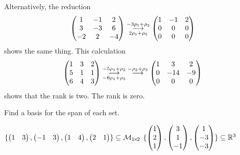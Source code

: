 \begin{exercises}
\begin{answer}
\begin{exparts}
           Alternatively, the reduction
           \begin{equation*}
             \begin{pmatrix}
               1  &-1  &2  \\
               3  &-3  &6  \\   
               -2 &2   &-4
             \end{pmatrix}
             \grstep[2\rho_1+\rho_3]{-3\rho_1+\rho_2}
             \begin{pmatrix}
               1  &-1  &2  \\
               0  &0   &0  \\   
               0  &0   &0 
             \end{pmatrix}
           \end{equation*}
           shows the same thing.
         \partsitem This calculation
           \begin{equation*}
             \begin{pmatrix}
               1  &3  &2  \\
               5  &1  &1  \\
               6  &4  &3  
             \end{pmatrix}
             \grstep[-6\rho_1+\rho_3]{-5\rho_1+\rho_2}
             \;\grstep{-\rho_2+\rho_3}
             \begin{pmatrix}
               1  &3   &2  \\
               0  &-14 &-9 \\
               0  &0   &0  
             \end{pmatrix}
           \end{equation*}
           shows that the rank is two.
         \partsitem The rank is zero.
       \end{exparts}  
     \end{answer}
  \recommended \item 
    Find a basis for the span of each set.
    \begin{exparts}
      \partsitem \(
        \set{\rowvec{1 &3},
          \rowvec{-1 &3},
          \rowvec{1 &4},
          \rowvec{2 &1}  }\subseteq\matspace_{\nbym{1}{2}} \)
      \partsitem \(
         \set{\colvec{1 \\2 \\1},
           \colvec{3 \\ 1 \\ -1},
           \colvec{1 \\ -3 \\ -3}  }\subseteq\Re^3  \)

\end{exparts}
\end{exercises}

